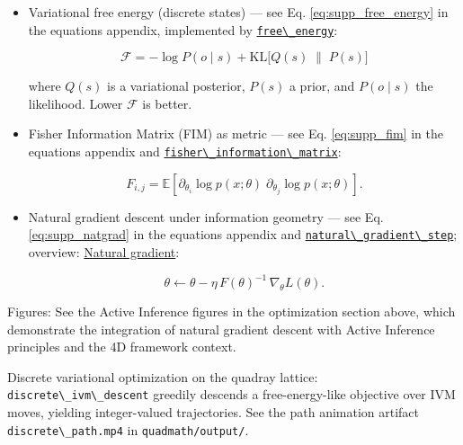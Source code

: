 \documentclass[
  10pt,
]{article}
\newcommand{\passthrough}[1]{#1}
\begin{document}
\begin{itemize}
\item
  Variational free energy (discrete states) --- see Eq.
  \eqref{eq:supp_free_energy} in the equations appendix, implemented by
  \href{08_equations_appendix.md\#code:free_energy}{\passthrough{\lstinline!free\_energy!}}:

  \begin{equation}\label{eq:free_energy_appendix_ref}
  \mathcal{F} = -\log P(o\mid s) + \mathrm{KL}\big[ Q(s)\;\|\; P(s) \big]
  \end{equation}

  where \(Q(s)\) is a variational posterior, \(P(s)\) a prior, and
  \(P(o\mid s)\) the likelihood. Lower \(\mathcal{F}\) is better.
\item
  Fisher Information Matrix (FIM) as metric --- see Eq.
  \eqref{eq:supp_fim} in the equations appendix and
  \href{08_equations_appendix.md\#code:fisher_information_matrix}{\passthrough{\lstinline!fisher\_information\_matrix!}}:

  \begin{equation}\label{eq:fim_definition}
  F_{i,j} = \mathbb{E}\left[ \partial_{\theta_i} \log p(x;\theta)\; \partial_{\theta_j} \log p(x;\theta) \right].
  \end{equation}
\item
  Natural gradient descent under information geometry --- see Eq.
  \eqref{eq:supp_natgrad} in the equations appendix and
  \href{08_equations_appendix.md\#code:natural_gradient_step}{\passthrough{\lstinline!natural\_gradient\_step!}};
  overview:
  \href{https://en.wikipedia.org/wiki/Natural_gradient}{Natural
  gradient}:

  \begin{equation}\label{eq:natural_gradient_update}
  \theta \leftarrow \theta - \eta\, F(\theta)^{-1}\, \nabla_{\theta} L(\theta).
  \end{equation}
\end{itemize}

Figures: See the Active Inference figures in the optimization section
above, which demonstrate the integration of natural gradient descent
with Active Inference principles and the 4D framework context.

Discrete variational optimization on the quadray lattice:
\passthrough{\lstinline!discrete\_ivm\_descent!} greedily descends a
free-energy-like objective over IVM moves, yielding integer-valued
trajectories. See the path animation artifact
\passthrough{\lstinline!discrete\_path.mp4!} in
\passthrough{\lstinline!quadmath/output/!}.
\end{document}
